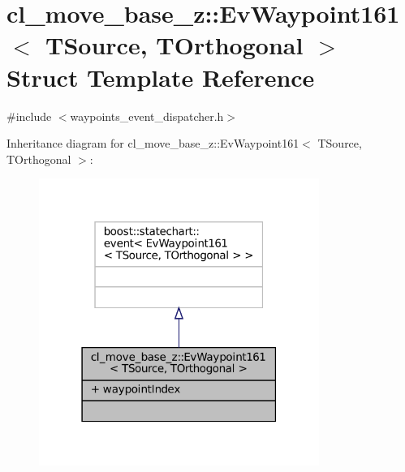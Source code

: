 \hypertarget{structcl__move__base__z_1_1EvWaypoint161}{}\section{cl\+\_\+move\+\_\+base\+\_\+z\+:\+:Ev\+Waypoint161$<$ T\+Source, T\+Orthogonal $>$ Struct Template Reference}
\label{structcl__move__base__z_1_1EvWaypoint161}


{\ttfamily \#include $<$waypoints\+\_\+event\+\_\+dispatcher.\+h$>$}



Inheritance diagram for cl\+\_\+move\+\_\+base\+\_\+z\+:\+:Ev\+Waypoint161$<$ T\+Source, T\+Orthogonal $>$\+:
\nopagebreak
\begin{figure}[H]
\begin{center}
\leavevmode
\includegraphics[width=259pt]{structcl__move__base__z_1_1EvWaypoint161__inherit__graph}
\end{center}
\end{figure}


